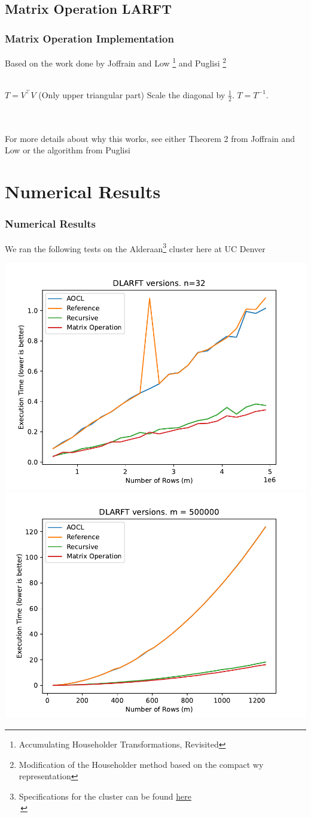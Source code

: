 \documentclass[12pt]{beamer}
\begin{document}
    \subsection{Matrix Operation LARFT}
    \begin{frame}
        \frametitle{Matrix Operation Implementation}
        Based on the work done by Joffrain and Low \footnote{Accumulating Householder Transformations, Revisited} and Puglisi \footnote{Modification of the Householder method based on the compact wy representation}
        \\\,\\
        \begin{algorithmic}
            \State $T = V^\top V$ (Only upper triangular part)
            \State Scale the diagonal by $\frac{1}{2}$.
            \State $T = T^{-1}$.
        \end{algorithmic}
        \,\\\,\\
        For more details about why this works, see either Theorem 2 from Joffrain and Low or the algorithm from Puglisi
    \end{frame}
    \section{Numerical Results}
    \begin{frame}
        \frametitle{Numerical Results}
        We ran the following tests on the Alderaan\footnote{Specifications for the cluster can be found \textcolor{blue}{\href{https://ccm-docs.readthedocs.io/en/latest/alderaan\#hardware}{here}}\\\,} cluster here at UC Denver\\
        \begin{center}
        \includegraphics[width=.4\textwidth]{figs/dlarftNBTime.pdf}
        \includegraphics[width=.4\textwidth]{figs/dlarftNVaryTime.pdf}
        \end{center}
    \end{frame}
\end{document}
